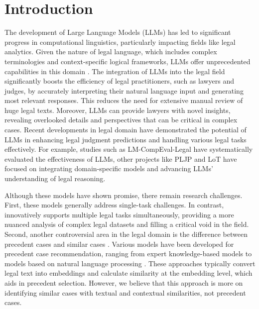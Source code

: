 

\maketitle

\section{Introduction}
The development of Large Language Models (LLMs) has led to significant progress in computational linguistics, particularly impacting fields like legal analytics. Given the nature of legal language, which includes complex terminologies and context-specific logical frameworks, LLMs offer unprecedented capabilities in this domain \cite{naveed2023comprehensive}. The integration of LLMs into the legal field significantly boosts the efficiency of legal practitioners, such as lawyers and judges, by accurately interpreting their natural language input and generating most relevant responses. This reduces the need for extensive manual review of huge legal texts. Moreover, LLMs can provide lawyers with novel insights, revealing overlooked details and perspectives that can be critical in complex cases. Recent developments in legal domain have demonstrated the potential of LLMs in enhancing legal judgment predictions and handling various legal tasks effectively. For example, studies such as LM-CompEval-Legal \cite{shui2023comprehensive} have systematically evaluated the effectiveness of LLMs, other projects like PLJP \cite{wu2023precedent} and LoT \cite{jiang2023legal} have focused on integrating domain-specific models and advancing LLMs' understanding of legal reasoning.

Although these models have shown promise, there remain research challenges. First, these models generally address single-task challenges. In contrast, \sysname innovatively supports multiple legal tasks simultaneously, providing a more nuanced analysis of complex legal datasets and filling a critical void in the field. Second, another controversial area in the legal domain is the difference between precedent cases and similar cases \cite{qin2023incorporating}. Various models have been developed for precedent case recommendation, ranging from expert knowledge-based models to models based on natural language processing \cite{mentzingen2023automation, cao2024pilot, ma2023caseencoder, lewis2021precedent}. These approaches typically convert legal text into embeddings and calculate similarity at the embedding level, which aids in precedent selection. However, we believe that this approach is more on identifying similar cases with textual and contextual similarities, not precedent cases.

